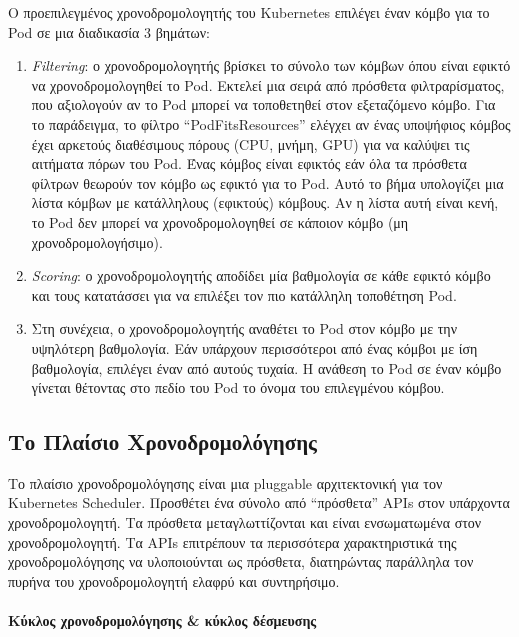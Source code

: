 Ο προεπιλεγμένος χρονοδρομολογητής του Kubernetes επιλέγει έναν κόμβο για το Pod
σε μια διαδικασία 3 βημάτων:
\begin{enumerate}
      \tightlist
      \item \textit{Filtering}: ο χρονοδρομολογητής βρίσκει το σύνολο των κόμβων
            όπου είναι εφικτό να χρονοδρομολογηθεί το Pod. Εκτελεί μια σειρά από
            πρόσθετα φιλτραρίσματος, που αξιολογούν αν το Pod μπορεί να
            τοποθετηθεί στον εξεταζόμενο κόμβο. Για το παράδειγμα, το φίλτρο
            ``PodFitsResources'' ελέγχει αν ένας υποψήφιος κόμβος έχει αρκετούς
            διαθέσιμους πόρους (CPU, μνήμη, GPU) για να καλύψει τις αιτήματα
            πόρων του Pod. Ένας κόμβος είναι εφικτός εάν όλα τα πρόσθετα φίλτρων
            θεωρούν τον κόμβο ως εφικτό για το Pod. Αυτό το βήμα υπολογίζει μια
            λίστα κόμβων με κατάλληλους (εφικτούς) κόμβους. Αν η λίστα αυτή
            είναι κενή, το Pod δεν μπορεί να χρονοδρομολογηθεί σε κάποιον κόμβο
            (μη χρονοδρομολογήσιμο).
      \item \textit{Scoring}: ο χρονοδρομολογητής αποδίδει μία βαθμολογία σε
            κάθε εφικτό κόμβο και τους κατατάσσει για να επιλέξει τον πιο
            κατάλληλη τοποθέτηση Pod.
      \item Στη συνέχεια, ο χρονοδρομολογητής αναθέτει το Pod στον κόμβο με την
            υψηλότερη βαθμολογία. Εάν υπάρχουν περισσότεροι από ένας κόμβοι με
            ίση βαθμολογία, επιλέγει έναν από αυτούς τυχαία. Η ανάθεση το Pod σε
            έναν κόμβο γίνεται θέτοντας στο πεδίο  του Pod το
            όνομα του επιλεγμένου κόμβου.
\end{enumerate}


\subsection{Το Πλαίσιο Χρονοδρομολόγησης}

Το πλαίσιο χρονοδρομολόγησης είναι μια pluggable αρχιτεκτονική για τον
Kubernetes Scheduler. Προσθέτει ένα σύνολο από ``πρόσθετα'' APIs στον υπάρχοντα
χρονοδρομολογητή. Τα πρόσθετα μεταγλωττίζονται και είναι ενσωματωμένα στον
χρονοδρομολογητή. Τα APIs επιτρέπουν τα περισσότερα χαρακτηριστικά της
χρονοδρομολόγησης να υλοποιούνται ως πρόσθετα, διατηρώντας παράλληλα τον πυρήνα
του χρονοδρομολογητή ελαφρύ και συντηρήσιμο.

\paragraph*{Κύκλος χρονοδρομολόγησης \& κύκλος δέσμευσης}


